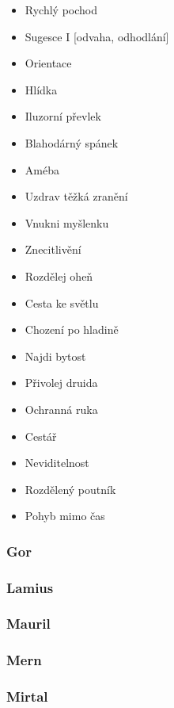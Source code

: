 \documentclass[../main.tex]{subfiles}
\begin{document}
\begin{multicols}{2}
	\begin{itemize}
		\item Rychlý pochod
		\item Sugesce I [odvaha, odhodlání]
		\item Orientace
		\item Hlídka
		\item Iluzorní převlek
		\item Blahodárný spánek
		\item Améba
		\item Uzdrav těžká zranění
		\item Vnukni myšlenku
		\item Znecitlivění
		\item Rozdělej oheň
		\item Cesta ke světlu
		\item Chození po hladině
		\item Najdi bytost
		\item Přivolej druida
		\item Ochranná ruka 
		\item Cestář
		\item Neviditelnost
		\item Rozdělený poutník
		\item Pohyb mimo čas
	\end{itemize}
\end{multicols}

\subsubsection{Gor}
\label{sec:gor}

\subsubsection{Lamius}
\label{sec:lamius}

\subsubsection{Mauril}
\label{sec:mauril}

\subsubsection{Mern}
\label{sec:mern}

\subsubsection{Mirtal}
\label{sec:mirtal}
\end{document}
